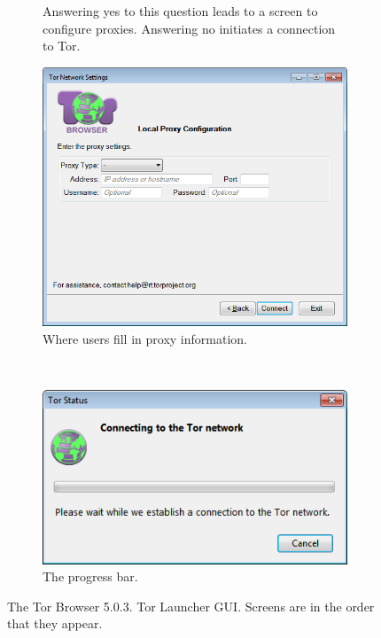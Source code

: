 \documentclass[USenglish,oneside,twocolumn]{article}
\begin{document}
\begin{figure}
\begin{subfigure}[b]{0.35\textwidth}
	\caption{Answering yes to this question leads to a screen to configure proxies. Answering no initiates a connection to Tor.}
	\label{fig:old-proxy}
\end{subfigure}
\begin{subfigure}[b]{0.35\textwidth}
	\includegraphics[width=\textwidth]{screenshots/OLD-proxyYES.png}
	\caption{Where users fill in proxy information.}
	\label{fig:old-proxy-yes}
\end{subfigure}
~~~~~~~~~~
\begin{subfigure}[b]{0.35\textwidth}
	\includegraphics[width=\textwidth]{screenshots/OLD-progress.png}
	\caption{The progress bar.}
	\label{fig:old-progress}
\end{subfigure}
\caption{
The Tor Browser 5.0.3. Tor Launcher GUI. Screens are in the order that they appear. 
}
\label{fig:old-interface}
\end{figure} 
\end{document}
